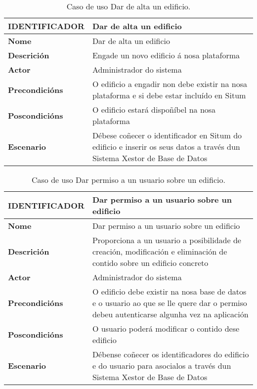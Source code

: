 \begin{table}[tbh]
	\begin{tabular}{|l|p{10cm}|}
		\hline 
		\textbf{IDENTIFICADOR}	& \textbf{Dar de alta un edificio} \\ 
		\hline 
		\textbf{Nome} & Dar de alta un edificio \\ 
		\hline 
		\textbf{Descrición} & Engade un novo edificio á nosa plataforma \\ 
		\hline 
		\textbf{Actor} & Administrador do sistema \\ 
		\hline 
		\textbf{Precondicións} & O edificio a engadir non debe existir na nosa plataforma e si debe estar incluído en Situm \\ 
		\hline 
		\textbf{Poscondicións} & O edificio estará dispoñíbel na nosa plataforma \\ 
		\hline 
		\textbf{Escenario} & Débese coñecer o identificador en Situm do edificio e inserir os seus datos a través dun Sistema Xestor de Base de Datos \\ 
		\hline 
	\end{tabular}
	\caption{Caso de uso Dar de alta un edificio.}
	\label{tab:cuAltaEdificio}
\end{table}

\begin{table}[tbh]
	\begin{tabular}{|l|p{10cm}|}
		\hline 
		\textbf{IDENTIFICADOR}	& \textbf{Dar permiso a un usuario sobre un edificio} \\ 
		\hline 
		\textbf{Nome} & Dar permiso a un usuario sobre un edificio \\ 
		\hline 
		\textbf{Descrición} & Proporciona a un usuario a posibilidade de creación, modificación e eliminación de contido sobre un edificio concreto \\ 
		\hline 
		\textbf{Actor} & Administrador do sistema \\ 
		\hline 
		\textbf{Precondicións} & O edificio debe existir na nosa base de datos e o usuario ao que se lle quere dar o permiso debeu autenticarse algunha vez na aplicación \\ 
		\hline 
		\textbf{Poscondicións} & O usuario poderá modificar o contido dese edificio \\ 
		\hline 
		\textbf{Escenario} & Débense coñecer os identificadores do edificio e do usuario para asocialos a través dun Sistema Xestor de Base de Datos \\ 
		\hline 
	\end{tabular}
	\caption{Caso de uso Dar permiso a un usuario sobre un edificio.}
	\label{tab:cuDarPermisoUsuarioEdificio}
\end{table}

